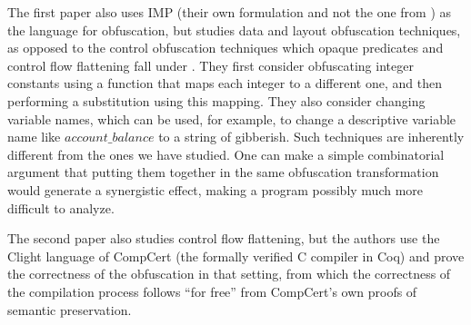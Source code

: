 \documentclass[compsoc,conference,a4paper,10pt,times]{IEEEtran}
\begin{document}
The first paper
\cite{Blazy1} also uses IMP (their own formulation and not the one from \cite{SFV2}) as the language for obfuscation, but studies data and layout obfuscation techniques, as opposed to the control obfuscation techniques which opaque predicates and control flow flattening fall under \cite{CollbergTax}.
%
%
They first consider obfuscating integer constants using a function that maps each integer to a different one, and then performing a substitution using this mapping.  They also consider changing variable names, which can be used, for example, to change a descriptive variable name like $account\_balance$ to a string of gibberish.
Such techniques are inherently different from the ones we have studied. One can make a simple combinatorial argument that putting them together in the same obfuscation transformation would generate a synergistic effect, making a program possibly much more difficult to analyze.

The second paper
\cite{Blazy2} also studies control flow flattening, but the authors use the Clight language of CompCert \cite{CompCert} (the formally verified C compiler in Coq) and prove the correctness of the obfuscation in that setting, from which the correctness of the compilation process follows ``for free'' from CompCert's own proofs of semantic preservation.
\end{document}

